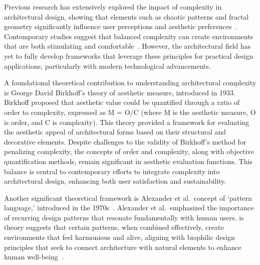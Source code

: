 

Previous research has extensively explored the impact of complexity in architectural design, showing that elements such as chaotic patterns and fractal geometry significantly influence user perceptions and aesthetic preferences~\cite{Bies2016}.
Contemporary studies suggest that balanced complexity can create environments that are both stimulating and comfortable~\cite{Redies2015}.
However, the architectural field has yet to fully develop frameworks that leverage these principles for practical design applications, particularly with modern technological advancements.

A foundational theoretical contribution to understanding architectural complexity is George David Birkhoff's theory of aesthetic measure, introduced in 1933.
Birkhoff proposed that aesthetic value could be quantified through a ratio of order to complexity, expressed as M = O/C (where M is the aesthetic measure, O is order, and C is complexity)\cite{Douchova2016}.
This theory provided a framework for evaluating the aesthetic appeal of architectural forms based on their structural and decorative elements.
Despite challenges to the validity of Birkhoff's method for penalizing complexity, the concepts of order and complexity, along with objective quantification methods, remain significant in aesthetic evaluation functions\cite{Javaheri2016}.
This balance is central to contemporary efforts to integrate complexity into architectural design, enhancing both user satisfaction and sustainability.

Another significant theoretical framework is Alexander et al.~concept of `pattern language,' introduced in the 1970s~\cite{Alexander1977}.
Alexander et al.~emphasized the importance of recurring design patterns that resonate fundamentally with human users.
is theory suggests that certain patterns, when combined effectively, create environments that feel harmonious and alive, aligning with biophilic design principles that seek to connect architecture with natural elements to enhance human well-being~\cite{Downton2017}.

